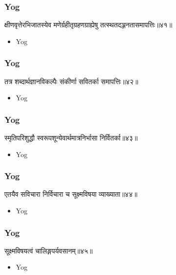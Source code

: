\begin{frame}[fragile]\frametitle{Yog}
\begin{sanskrit}
क्षीणवृत्तेरभिजातस्येव मणेर्ग्रहीतृग्रहणग्राह्येषु तत्स्थतदञ्जनतासमापत्तिः॥४१॥
\end{sanskrit}
	\begin{itemize}
	\item Yog 
	\end{itemize}
\end{frame}

\begin{frame}[fragile]\frametitle{Yog}
\begin{sanskrit}
तत्र शब्दार्थज्ञानविकल्पैः संकीर्णा सवितर्का समापत्तिः॥४२॥
\end{sanskrit}
	\begin{itemize}
	\item Yog 
	\end{itemize}
\end{frame}


\begin{frame}[fragile]\frametitle{Yog}
\begin{sanskrit}
स्मृतिपरिशुद्धौ स्वरूपशून्येवार्थमात्रनिर्भासा निर्वितर्का॥४३॥
\end{sanskrit}
	\begin{itemize}
	\item Yog 
	\end{itemize}
\end{frame}


\begin{frame}[fragile]\frametitle{Yog}
\begin{sanskrit}
एतयैव सविचारा निर्विचारा च सूक्ष्मविषया व्याख्याता॥४४॥
\end{sanskrit}
	\begin{itemize}
	\item Yog 
	\end{itemize}
\end{frame}


\begin{frame}[fragile]\frametitle{Yog}
\begin{sanskrit}
सूक्ष्मविषयत्वं चालिङ्गपर्यवसानम्॥४५॥
\end{sanskrit}
	\begin{itemize}
	\item Yog 
	\end{itemize}
\end{frame}

